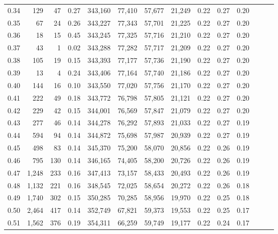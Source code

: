 \begin{tabular}{rrrrrrrrrrrrrr}
0.34 &     129 &     47 &  0.27 &  343,160 &   77,410 &  57,677 &  21,249 &  0.22 &  0.27 &      0.20 \\
0.35 &      67 &     24 &  0.26 &  343,227 &   77,343 &  57,701 &  21,225 &  0.22 &  0.27 &      0.20 \\
0.36 &      18 &     15 &  0.45 &  343,245 &   77,325 &  57,716 &  21,210 &  0.22 &  0.27 &      0.20 \\
0.37 &      43 &      1 &  0.02 &  343,288 &   77,282 &  57,717 &  21,209 &  0.22 &  0.27 &      0.20 \\
0.38 &     105 &     19 &  0.15 &  343,393 &   77,177 &  57,736 &  21,190 &  0.22 &  0.27 &      0.20 \\
0.39 &      13 &      4 &  0.24 &  343,406 &   77,164 &  57,740 &  21,186 &  0.22 &  0.27 &      0.20 \\
0.40 &     144 &     16 &  0.10 &  343,550 &   77,020 &  57,756 &  21,170 &  0.22 &  0.27 &      0.20 \\
0.41 &     222 &     49 &  0.18 &  343,772 &   76,798 &  57,805 &  21,121 &  0.22 &  0.27 &      0.20 \\
0.42 &     229 &     42 &  0.15 &  344,001 &   76,569 &  57,847 &  21,079 &  0.22 &  0.27 &      0.20 \\
0.43 &     277 &     46 &  0.14 &  344,278 &   76,292 &  57,893 &  21,033 &  0.22 &  0.27 &      0.19 \\
0.44 &     594 &     94 &  0.14 &  344,872 &   75,698 &  57,987 &  20,939 &  0.22 &  0.27 &      0.19 \\
0.45 &     498 &     83 &  0.14 &  345,370 &   75,200 &  58,070 &  20,856 &  0.22 &  0.26 &      0.19 \\
0.46 &     795 &    130 &  0.14 &  346,165 &   74,405 &  58,200 &  20,726 &  0.22 &  0.26 &      0.19 \\
0.47 &   1,248 &    233 &  0.16 &  347,413 &   73,157 &  58,433 &  20,493 &  0.22 &  0.26 &      0.19 \\
0.48 &   1,132 &    221 &  0.16 &  348,545 &   72,025 &  58,654 &  20,272 &  0.22 &  0.26 &      0.18 \\
0.49 &   1,740 &    302 &  0.15 &  350,285 &   70,285 &  58,956 &  19,970 &  0.22 &  0.25 &      0.18 \\
0.50 &   2,464 &    417 &  0.14 &  352,749 &   67,821 &  59,373 &  19,553 &  0.22 &  0.25 &      0.17 \\
0.51 &   1,562 &    376 &  0.19 &  354,311 &   66,259 &  59,749 &  19,177 &  0.22 &  0.24 &      0.17 \\

\end{tabular}
